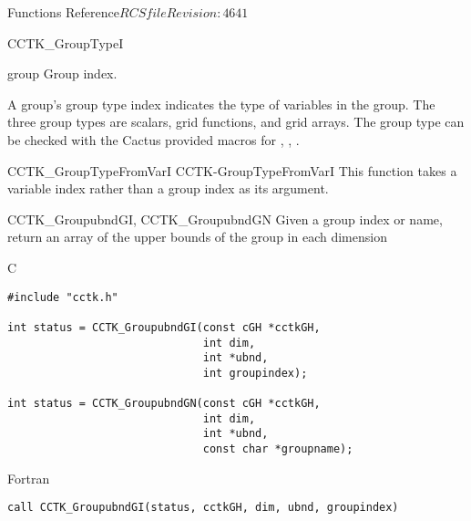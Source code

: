 \begin{cactuspart}{ Functions Reference}{$RCSfile$}{$Revision: 4641 $}
\begin{FunctionDescription}{CCTK\_GroupTypeI}{}
\begin{ParameterSection}
\begin{Parameter}{group}
Group index.
\end{Parameter}
\end{ParameterSection}

\begin{Discussion}
A group's group type index indicates the type of variables in the
group.  The three group types are scalars, grid functions, and grid
arrays. The group type can be checked with the Cactus provided macros
for , , .
\end{Discussion}

\begin{SeeAlsoSection}
\begin{SeeAlso2} {CCTK\_GroupTypeFromVarI} {CCTK-GroupTypeFromVarI}
This function takes a variable index rather than a group index as its argument.
\end{SeeAlso2}
\end{SeeAlsoSection}
\end{FunctionDescription}


\begin{FunctionDescription}{CCTK\_GroupubndGI, CCTK\_GroupubndGN}
\label{CCTK-GroupubndGI}
\label{CCTK-GroupubndGN}
Given a group index or name, return an array of the upper bounds of the group in each dimension

\begin{SynopsisSection}
\begin{Synopsis}{C}
\begin{verbatim}
#include "cctk.h"

int status = CCTK_GroupubndGI(const cGH *cctkGH,
                              int dim,
                              int *ubnd,
                              int groupindex);

int status = CCTK_GroupubndGN(const cGH *cctkGH,
                              int dim,
                              int *ubnd,
                              const char *groupname);
\end{verbatim}
\end{Synopsis}
\begin{Synopsis}{Fortran}
\begin{verbatim}
call CCTK_GroupubndGI(status, cctkGH, dim, ubnd, groupindex)


\end{verbatim}
\end{Synopsis}
\end{SynopsisSection}
\end{FunctionDescription}
\end{cactuspart}
